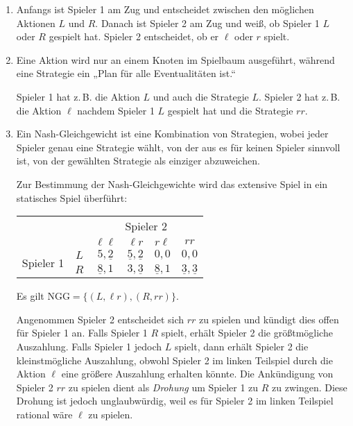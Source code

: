 \begin{enumerate}
  \item Anfangs ist Spieler 1 am Zug und entscheidet zwischen den möglichen Aktionen $L$
    und $R$.
    Danach ist Spieler 2 am Zug und weiß, ob Spieler 1 $L$ oder $R$ gespielt hat.
    Spieler 2 entscheidet, ob er $\ell$ oder $r$ spielt.

  \item Eine Aktion wird nur an einem Knoten im Spielbaum ausgeführt, während eine
    Strategie ein „Plan für alle Eventualitäten ist.“

    Spieler 1 hat z.\,B. die Aktion $L$ und auch die Strategie $L$.
    Spieler 2 hat z.\,B. die Aktion $\ell$ nachdem Spieler 1 $L$ gespielt hat
    und die Strategie $rr$.

  \item Ein Nash-Gleichgewicht ist eine Kombination von Strategien, wobei jeder Spieler
    genau eine Strategie wählt, von der aus es für keinen Spieler sinnvoll ist, von der
    gewählten Strategie als einziger abzuweichen.

    Zur Bestimmung der Nash-Gleichgewichte wird das extensive Spiel in ein statisches
    Spiel überführt:

    \begin{center}
      \begin{tabular}{cccccc}
        & & \multicolumn{4}{c}{Spieler 2}\\
        & & $\ell \ell$ & $\ell r$ & $r \ell$ & $rr$\\
        \cmidrule{3-6}
        \multirow{2}{*}{Spieler 1}
        & $L$ & $5,\underline{2}$ & $\underline{5},\underline{2}$ & $0,0$ & $0,0$\\
        \cmidrule{3-6}
        & $R$ & $\underline{8},1$ & $3,\underline{3}$ & $\underline{8},1$ &
        $\underline{3},\underline{3}$\\
        \cmidrule{3-6}
      \end{tabular}
    \end{center}

    Es gilt $\text{NGG} = \{(L, \ell r), (R, rr)\}$.

    Angenommen Spieler 2 entscheidet sich $rr$ zu spielen und kündigt dies offen für
    Spieler 1 an.
    Falls Spieler 1 $R$ spielt, erhält Spieler 2 die größtmögliche Auszahlung.
    Falls Spieler 1 jedoch $L$ spielt, dann erhält Spieler 2 die kleinstmögliche
    Auszahlung, obwohl Spieler 2 im linken Teilspiel durch die Aktion $\ell$ eine größere
    Auszahlung erhalten könnte.
    Die Ankündigung von Spieler 2 $rr$ zu spielen dient als \emph{Drohung} um Spieler 1 zu
    $R$ zu zwingen.
    Diese Drohung ist jedoch unglaubwürdig, weil es für Spieler 2 im linken Teilspiel
    rational wäre $\ell$ zu spielen.


\end{enumerate}
